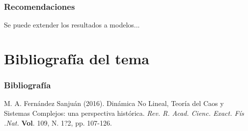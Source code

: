 \documentclass{beamer}
\begin{document}
\begin{frame}
	\frametitle{Recomendaciones}
	\begin{minipage}{10cm}
		Se puede extender los resultados a modelos... 
	\end{minipage}
\end{frame}
\section{Bibliograf\'ia del tema}
\begin{frame}
\frametitle{Bibliograf\'ia}
\begin{thebibliography}{99}

 M. A. Fern\'andez Sanju\'an (2016). Din\'amica No Lineal, Teor\'ia del Caos y Sistemas Complejos: una perspectiva hist\'orica. {\em Rev. R. Acad. Cienc. Exact. F\'is .Nat.} \textbf{Vol}. 109, N. 1?2, pp. 107-126.
\end{thebibliography}	
\end{frame}
\end{document}
